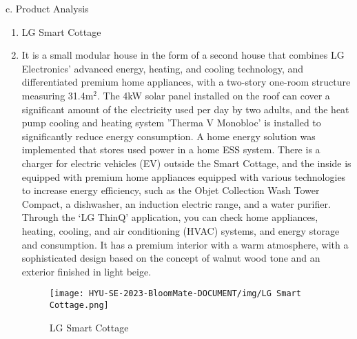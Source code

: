 \documentclass[conference, a4paper]{IEEEtran}
\begin{document}
\indent c. Product Analysis
\begin{enumerate}
\item LG Smart Cottage
\item[] It is a small modular house in the form of a second house that combines LG Electronics' advanced energy, heating, and cooling technology, and differentiated premium home appliances, with a two-story one-room structure measuring 31.4m$^2$.
The 4kW solar panel installed on the roof can cover a significant amount of the electricity used per day by two adults, and the heat pump cooling and heating system 'Therma V Monobloc' is installed to significantly reduce energy consumption. A home energy solution was implemented that stores used power in a home ESS system. There is a charger for electric vehicles (EV) outside the Smart Cottage, and the inside is equipped with premium home appliances equipped with various technologies to increase energy efficiency, such as the Objet Collection Wash Tower Compact, a dishwasher, an induction electric range, and a water purifier. Through the ‘LG ThinQ’ application, you can check home appliances, heating, cooling, and air conditioning (HVAC) systems, and energy storage and consumption. It has a premium interior with a warm atmosphere, with a sophisticated design based on the concept of walnut wood tone and an exterior finished in light beige. \\
\newpage
\begin{figure}[h]
\texttt{[image: HYU-SE-2023-BloomMate-DOCUMENT/img/LG Smart Cottage.png]}
\label{fig:LGsmartcottage}
\caption{LG Smart Cottage} 
\end{figure}


\end{enumerate}
\end{document}
